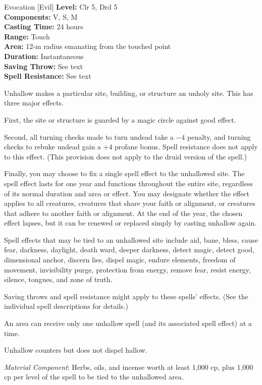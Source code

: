 {Evocation [Evil]}
{
	\textbf{Level:}
	Clr 5, Drd 5\\
	\textbf{Components:}
	V, S, M\\
	\textbf{Casting Time:}
	24 hours\\
	\textbf{Range:}
	Touch\\
	\textbf{Area:}
	12-m radius emanating from the touched point\\
	\textbf{Duration:}
	Instantaneous\\
	\textbf{Saving Throw:}
	See text\\
	\textbf{Spell Resistance:}
	See text\\
}
{
	Unhallow makes a particular site, building, or structure an unholy site. This has three major effects.

	First, the site or structure is guarded by a magic circle against good effect.

	Second, all turning checks made to turn undead take a $-4$ penalty, and turning checks to rebuke undead gain a +4 profane bonus. Spell resistance does not apply to this effect. (This provision does not apply to the druid version of the spell.)

	Finally, you may choose to fix a single spell effect to the unhallowed site. The spell effect lasts for one year and functions throughout the entire site, regardless of its normal duration and area or effect. You may designate whether the effect applies to all creatures, creatures that share your faith or alignment, or creatures that adhere to another faith or alignment. At the end of the year, the chosen effect lapses, but it can be renewed or replaced simply by casting unhallow again.

	Spell effects that may be tied to an unhallowed site include aid, bane, bless, cause fear, darkness, daylight, death ward, deeper darkness, detect magic, detect good, dimensional anchor, discern lies, dispel magic, endure elements, freedom of movement, invisibility purge, protection from energy, remove fear, resist energy, silence, tongues, and zone of truth.

Saving throws and spell resistance might apply to these spells' effects. (See the individual spell descriptions for details.)

	An area can receive only one unhallow spell (and its associated spell effect) at a time.

	Unhallow counters but does not dispel hallow.

	\textit{Material Component}:
	Herbs, oils, and incense worth at least 1,000 cp, plus 1,000 cp per level of the spell to be tied to the unhallowed area.

}
